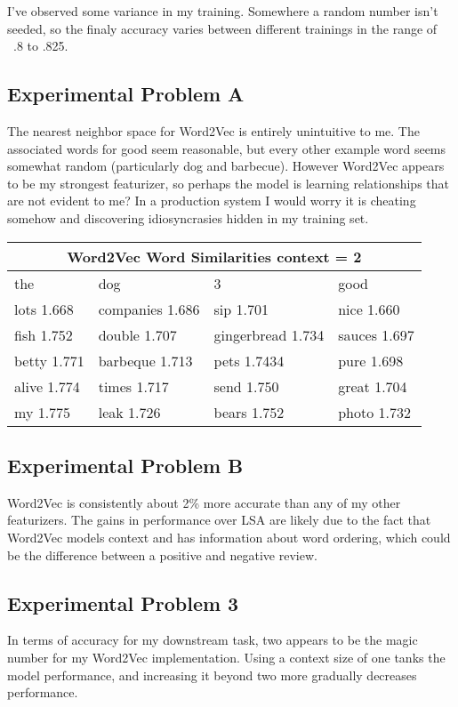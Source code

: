 I've observed some variance in my training. Somewhere a random number isn't seeded, so the finaly accuracy varies between different trainings in the range of ~.8 to .825.

\subsection*{Experimental Problem A}

The nearest neighbor space for Word2Vec is entirely unintuitive to me. The associated words for good seem reasonable, but every other example word seems somewhat random (particularly dog and barbecue). However Word2Vec appears to be my strongest featurizer, so perhaps the model is learning relationships that are not evident to me? In a production system I would worry it is cheating somehow and discovering idiosyncrasies hidden in my training set.

\begin{center}
    \begin{tabular}{ |p{3cm}|p{3cm}|p{4cm}|p{3cm}|  }
        \hline
        \multicolumn{4}{|c|}{Word2Vec Word Similarities context  = 2}    \\
        \hline
        the         & dog             & 3                 & good         \\
        \hline
        lots 1.668  & companies 1.686 & sip 1.701         & nice 1.660   \\
        fish 1.752  & double 1.707    & gingerbread 1.734 & sauces 1.697 \\
        betty 1.771 & barbeque 1.713  & pets 1.7434       & pure 1.698   \\
        alive 1.774 & times 1.717     & send 1.750        & great 1.704  \\
        my 1.775    & leak 1.726      & bears 1.752       & photo 1.732  \\
        \hline
    \end{tabular}
\end{center}
\subsection*{Experimental Problem B}
Word2Vec is consistently about 2\% more accurate than any of my other featurizers. The gains in performance over LSA are likely due to the fact that Word2Vec models context and has information about word ordering, which could be the difference between a positive and negative review.

\subsection*{Experimental Problem 3}
In terms of accuracy for my downstream task, two appears to be the magic number for my Word2Vec implementation. Using a context size of one tanks the model performance, and increasing it beyond two more gradually decreases performance.

